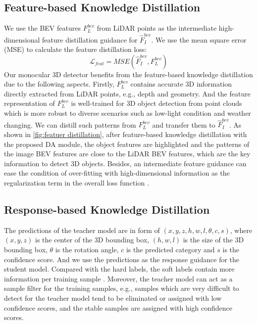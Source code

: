 \documentclass[runningheads]{llncs}
\begin{document}
\subsection{Feature-based Knowledge Distillation}
We use the BEV features $F^{bev}_{L}$ from LiDAR points as the intermediate high-dimensional feature distillation guidance for $\hat{F}^{bev}_{I}$.
We use the mean square error (MSE) to calculate the feature distillation loss:
\begin{equation}
    \mathcal{L}_{feat} = MSE(\hat{F}^{bev}_{I},F^{bev}_{L})
\end{equation}
Our monocular 3D detector benefits from the feature-based knowledge distillation due to the following aspects. 
Firstly, $F^{bev}_{L}$ contains accurate 3D information directly extracted from LiDAR points, e.g., depth and geometry.
And the feature representation of $F^{bev}_{L}$ is well-trained for 3D object detection from point clouds which is more robust to diverse scenarios such as low-light condition and weather changing. 
We can distill such patterns from $F^{bev}_{L}$ and transfer them to $\hat{F}^{bev}_{I}$.
As shown in \cref{fig:featuer distillation}, 
after feature-based knowledge distillation with the proposed DA module, the object features are highlighted and the patterns of the image BEV features are close to the LiDAR BEV features, which are the key information to detect 3D objects.
Besides, an intermediate feature guidance can ease the condition of over-fitting with high-dimensional information as the regularization term in the overall loss function \cite{fitnets,knowledgematters}.

\subsection{Response-based Knowledge Distillation}
The predictions of the teacher model are in form of $(x,y,z,h,w,l,\theta,c,s)$, where $(x,y,z)$ is the center of the 3D bounding box, $(h,w,l)$ is the size of the 3D bounding box, $\theta$ is the rotation angle, $c$ is the predicted category and $s$ is the confidence score.
And we use the predictions as the response guidance for the student model.
Compared with the hard labels, the soft labels contain more information per training sample \cite{distilling,sessd}.
Moreover, the teacher model can act as a sample filter for the training samples, e.g., samples which are very difficult to detect for the teacher model tend to be eliminated or assigned with low confidence scores, and the stable samples are assigned with high confidence scores. 
\end{document}

